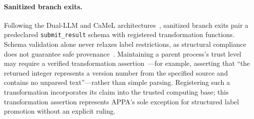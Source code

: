 \paragraph{Sanitized branch exits.}
Following the Dual-LLM and CaMeL architectures~\cite{willison2023dual,camel2025}, sanitized branch exits pair a predeclared \nolinkurl{submit_result} schema with registered transformation functions. Schema validation alone never relaxes label restrictions, as structural compliance does not guarantee safe provenance~\cite{sabelfeld2003language}. Maintaining a parent process's trust level may require a verified transformation assertion~\cite{zdancewic2001robust}—for example, asserting that ``the returned integer represents a version number from the specified source and contains no unparsed text''—rather than simple parsing. Registering such a transformation incorporates its claim into the trusted computing base; this transformation assertion represents APPA's sole exception for structured label promotion without an explicit ruling.
